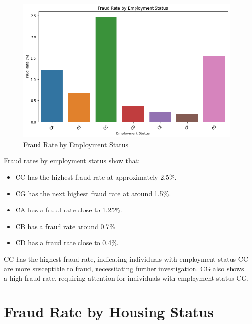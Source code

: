 \documentclass[12pt,a4paper]{report}
\begin{document}
\begin{figure}[h]
    \centering
    \includegraphics[width=\textwidth]{employment_status_fraud_rate.png}
    \caption{Fraud Rate by Employment Status}
    \label{fig:employment_status_fraud_rate}
\end{figure}

Fraud rates by employment status show that:

\begin{itemize}
    \item CC has the highest fraud rate at approximately 2.5\%.
    \item CG has the next highest fraud rate at around 1.5\%.
    \item CA has a fraud rate close to 1.25\%.
    \item CB has a fraud rate around 0.7\%.
    \item CD has a fraud rate close to 0.4\%.
\end{itemize}

CC has the highest fraud rate, indicating individuals with employment status CC are more susceptible to fraud, necessitating further investigation. CG also shows a high fraud rate, requiring attention for individuals with employment status CG.

\section{Fraud Rate by Housing Status}
\end{document}
